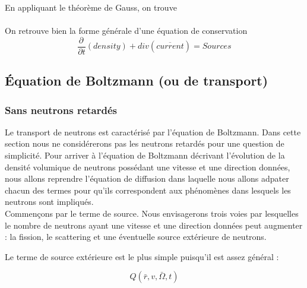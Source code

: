 En appliquant le théorème de Gauss, on trouve\\

\ \\

On retrouve bien la forme générale d'une équation de conservation
\begin{equation}
\frac{{\partial \,}}{{\partial t}}\left( {density} \right) + div(\overline {current} ) = Sources
\end{equation}


\subsection{Équation de Boltzmann (ou de transport)}
\subsubsection{Sans neutrons retardés}

Le transport de neutrons est caractérisé par l'équation de Boltzmann. Dans cette section nous
ne considérerons pas les neutrons retardés pour une question de simplicité. Pour arriver
à l'équation de Boltzmann décrivant l'évolution de la densité volumique de neutrons
possédant une vitesse et une direction données, nous allons reprendre l'équation de diffusion dans laquelle
nous allons adpater chacun des termes pour qu'ils correspondent aux phénomènes dans lesquels
les neutrons sont impliqués.\\

Commençons par le terme de source. Nous envisagerons trois voies par lesquelles le nombre
de neutrons ayant une vitesse et une direction données peut augmenter : la fission, le
scattering et une éventuelle source extérieure de neutrons.

Le terme de source extérieure est le plus simple puisqu'il est assez général :

\begin{equation}
Q(\bar r,v,\bar \Omega ,t)
\end{equation}

